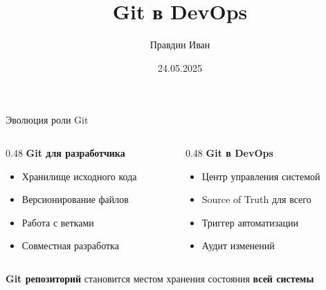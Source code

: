 \documentclass[aspectratio=169]{beamer}
\title{Git в DevOps}
\author{Правдин Иван}
\date{24.05.2025}
\begin{document}
    \maketitle

    \begin{frame}{Эволюция роли Git}
        \begin{columns}
            \begin{column}{0.48\textwidth}
                \textbf{Git для разработчика}
                \begin{itemize}
                    \item Хранилище исходного кода
                    \item Версионирование файлов
                    \item Работа с ветками
                    \item Совместная разработка
                \end{itemize}
            \end{column}

            \begin{column}{0.48\textwidth}
                \textbf{Git в DevOps}
                \begin{itemize}
                    \item Центр управления системой
                    \item Source of Truth для всего
                    \item Триггер автоматизации
                    \item Аудит изменений
                \end{itemize}
            \end{column}
        \end{columns}

        \vspace{0.5cm}

        \textbf{Git репозиторий} становится местом хранения состояния \textbf{всей системы}
    \end{frame}
\end{document}
